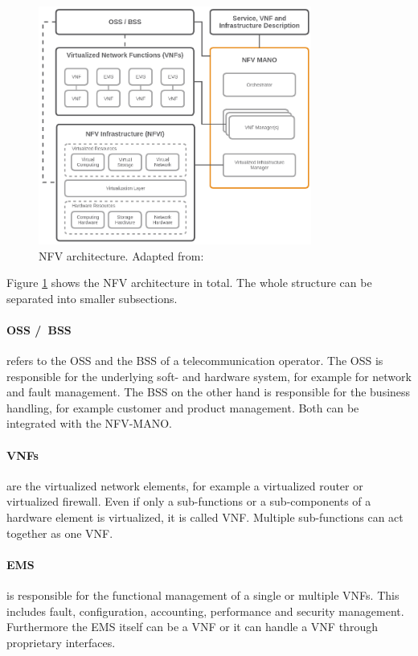 \begin{figure}[H]
    \centering
    \includegraphics[width=0.8\textwidth]{resources/images/nfv_architecture.png}
    \caption[NFV architecture]{NFV architecture. Adapted from: \autocite{NFV:Architecture}}
    \label{fig:nfv_architecture}
\end{figure}

Figure \ref{fig:nfv_architecture} shows the \ac{NFV} architecture in total.
The whole structure can be separated into smaller subsections.

\paragraph{\acs{OSS} /\ \acs{BSS}} refers to the \ac{OSS} and the \ac{BSS} of a telecommunication operator.\autocite[cf.]{Kahn:2015}
The \ac{OSS} is responsible for the underlying soft- and hardware system, for example for network and fault management.
The \ac{BSS} on the other hand is responsible for the business handling, for example customer and product management.
Both can be integrated with the \ac{NFV-MANO}.\autocite[cf.]{Kahn:2015}

\paragraph{\acp{VNF}} are the virtualized network elements, for example a virtualized router or virtualized firewall.
Even if only a sub-functions or a sub-components of a hardware element is virtualized, it is called \ac{VNF}.\autocite[cf.]{Kahn:2015}
Multiple sub-functions can act together as one \ac{VNF}.

\paragraph{\ac{EMS}} is responsible for the functional management of a single or multiple \acp{VNF}.\autocite[cf.]{Kahn:2015}
This includes fault, configuration, accounting, performance and security management.\autocite[cf.]{Kahn:2015}
Furthermore the \ac{EMS} itself can be a \ac{VNF} or it can handle a \ac{VNF} through proprietary interfaces.\autocite[cf.]{Kahn:2015}

